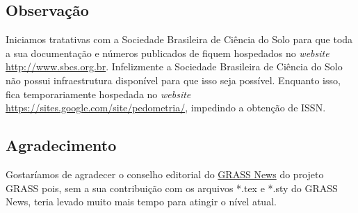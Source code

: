\subsection{Observação}

Iniciamos tratativas com a Sociedade Brasileira de Ciência do Solo para que toda a sua documentação e números publicados de \pedometria{} fiquem hospedados no \textit{website} \url{http://www.sbcs.org.br}. Infelizmente a Sociedade  Brasileira de Ciência do Solo não possui infraestrutura disponível para que isso seja possível. Enquanto isso, \pedometria{} fica temporariamente hospedada no \textit{website} \url{https://sites.google.com/site/pedometria/}, impedindo a obtenção de ISSN.

\subsection{Agradecimento}

Gostaríamos de agradecer o conselho editorial do \href{http://grass.osgeo.org/newsletter/}{GRASS News} do projeto GRASS pois, sem a sua contribuição com os arquivos *.tex e *.sty do GRASS News, \pedometria{} teria levado muito mais tempo para atingir o nível atual.
